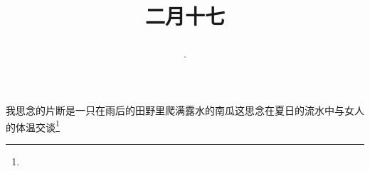 \title{\date[d=26,m=3,y=2024][year:cn-y,年,month:cn,day:cn,日,·,weekday]·二月十七 }
我思念的片断是一只在雨后的田野里爬满露水的南瓜这思念在夏日的流水中与女人的体温交谈\footnote{ }

